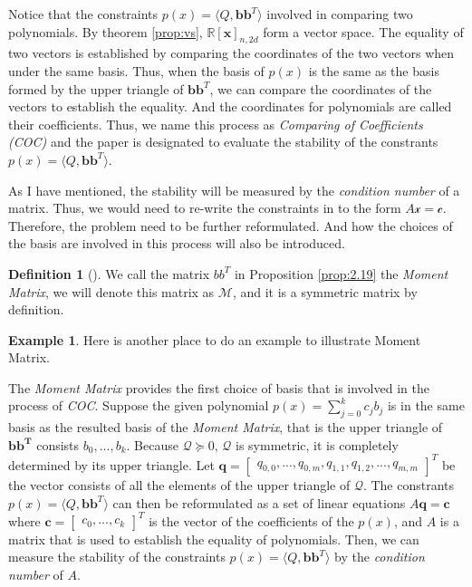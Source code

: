\documentclass[12pt]{amsart}
\numberwithin{equation}{section}
\theoremstyle{definition}
\newtheorem{definition}[thm]{Definition}
\newtheorem{example}[thm]{Example}
\numberwithin{thm}{section}
\begin{document}
Notice that the constraints $p(x) = \langle Q, \mathbf{bb}^T \rangle$ involved in comparing two polynomials. 
By theorem \ref{prop:vs}, $\mathbb{R}[\mathbf{x}]_{n, 2d}$ form a vector space. 
The equality of two vectors is established by comparing the coordinates of the two vectors when under the same basis. 
Thus, when the basis of $p(x)$ is the same as the basis formed by the upper triangle of $\mathbf{bb}^T$, we can compare the 
coordinates of the vectors to establish the equality. And the coordinates for polynomials are called their coefficients. 
Thus, we name this process as \emph{Comparing of Coefficients (COC)} and the paper is designated to evaluate the stability of the constrants $p(x) = \langle Q, \mathbf{bb}^T \rangle$.

As I have mentioned, the stability will be measured by the \emph{condition number} of a matrix. Thus, we would need to re-write the constraints in to the form $A \mathcal{x} = \mathcal{c}$. 
Therefore, the problem need to be further reformulated. And how the choices of the basis are involved in this process will also be introduced.

\begin{definition}[\cite{Recher:Masterthesis}]
     We call the matrix $bb^T$ in Proposition \ref{prop:2.19} the \emph{Moment Matrix}, we will denote this matrix as $\mathcal{M}$, and it is a symmetric matrix by definition.
\end{definition}

\begin{example}
     Here is another place to do an example to illustrate Moment Matrix.
\end{example}

\smallskip
The \emph{Moment Matrix} provides the first choice of basis that is involved in the process of \emph{COC}. 
Suppose the given polynomial $p(x) = \sum_{j = 0} ^ k c_j b_j$ 
is in the same basis as the resulted basis of the \emph{Moment Matrix}, 
that is the upper triangle of $\mathbf{bb^T}$ consists $b_0, ..., b_k$. 
Because $\mathcal{Q} \succcurlyeq 0$, $\mathcal{Q}$ is symmetric, 
it is completely determined by its upper triangle.
Let $\mathbf{q} = \begin{bmatrix} q_{0,0}, ..., q_{0, m}, q_{1,1}, q_{1, 2}, ..., q_{m, m} \end{bmatrix}^T$ 
be the vector consists of all the elements of the upper triangle of $\mathcal{Q}$.
The constrants $p(x) = \langle Q, \mathbf{bb}^T \rangle$ can then be reformulated as a set of linear equations 
$A \mathbf{q} = \mathbf{c}$ where $ \mathbf{c} = \begin{bmatrix}
     c_0, ..., c_k
\end{bmatrix}^T$ 
is the vector of the coefficients of the $p(x)$, 
and $A$ is a matrix that is used to establish the equality of polynomials. 
Then, we can measure the stability of the constraints $p(x) = \langle Q, \mathbf{bb}^T \rangle$ by the \emph{condition number} of $A$. 
\end{document}
